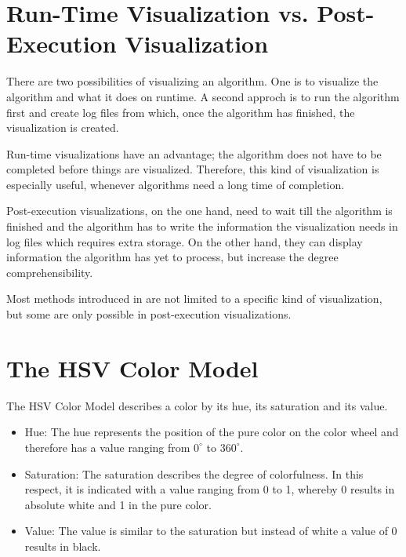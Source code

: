 \documentclass
[
    paper = a4,
    pagesize,
    12 pt,
    oneside,                       %
    open = right,
    DIV = calc,
    BCOR = 0 mm,                   %
    bibtotoc
]
{scrbook}
\begin{document}
\section{Run-Time Visualization vs. Post-Execution Visualization}

There are two possibilities of visualizing an algorithm.
One is to visualize the algorithm and what it does on runtime.
A second approch is to run the algorithm first and create log files from which, once the algorithm has finished, the visualization is created.

Run-time visualizations have an advantage; the algorithm does not have to be completed before things are visualized.
Therefore, this kind of visualization is especially useful, whenever algorithms need a long time of completion.

Post-execution visualizations, on the one hand, need to wait till the algorithm is finished and the algorithm has to write the information the visualization needs in log files which requires extra storage.
On the other hand, they can display information the algorithm has yet to process, but increase the degree comprehensibility.

Most methods introduced in  are not limited to a specific kind of visualization, but some are only possible in post-execution visualizations.



\section{The HSV Color Model}

The HSV Color Model describes a color by its hue, its saturation and its value.
\begin{itemize}
  \item Hue: The hue represents the position of the pure color on the color wheel and therefore has a value ranging from $0^\circ$ to $360^\circ$.
  \item Saturation: The saturation describes the degree of colorfulness. In this respect, it is indicated with a value ranging from 0 to 1, whereby 0 results in absolute white and 1 in the pure color.
  \item Value: The value is similar to the saturation but instead of white a value of 0 results in black.
\end{itemize}
\end{document}
